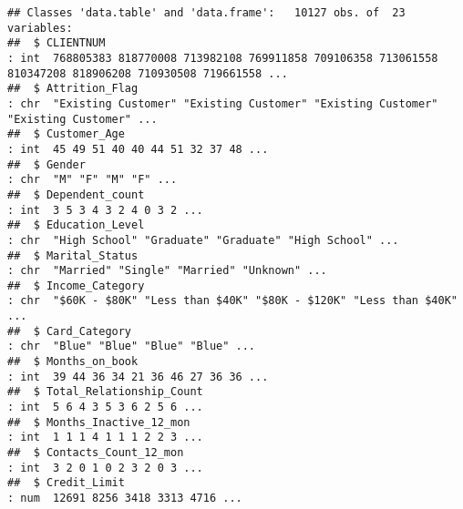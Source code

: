 \documentclass[]{article}
\begin{document}
\begin{verbatim}
## Classes 'data.table' and 'data.frame':   10127 obs. of  23 variables:
##  $ CLIENTNUM                                                                                                                         : int  768805383 818770008 713982108 769911858 709106358 713061558 810347208 818906208 710930508 719661558 ...
##  $ Attrition_Flag                                                                                                                    : chr  "Existing Customer" "Existing Customer" "Existing Customer" "Existing Customer" ...
##  $ Customer_Age                                                                                                                      : int  45 49 51 40 40 44 51 32 37 48 ...
##  $ Gender                                                                                                                            : chr  "M" "F" "M" "F" ...
##  $ Dependent_count                                                                                                                   : int  3 5 3 4 3 2 4 0 3 2 ...
##  $ Education_Level                                                                                                                   : chr  "High School" "Graduate" "Graduate" "High School" ...
##  $ Marital_Status                                                                                                                    : chr  "Married" "Single" "Married" "Unknown" ...
##  $ Income_Category                                                                                                                   : chr  "$60K - $80K" "Less than $40K" "$80K - $120K" "Less than $40K" ...
##  $ Card_Category                                                                                                                     : chr  "Blue" "Blue" "Blue" "Blue" ...
##  $ Months_on_book                                                                                                                    : int  39 44 36 34 21 36 46 27 36 36 ...
##  $ Total_Relationship_Count                                                                                                          : int  5 6 4 3 5 3 6 2 5 6 ...
##  $ Months_Inactive_12_mon                                                                                                            : int  1 1 1 4 1 1 1 2 2 3 ...
##  $ Contacts_Count_12_mon                                                                                                             : int  3 2 0 1 0 2 3 2 0 3 ...
##  $ Credit_Limit                                                                                                                      : num  12691 8256 3418 3313 4716 ...

\end{verbatim}
\end{document}
